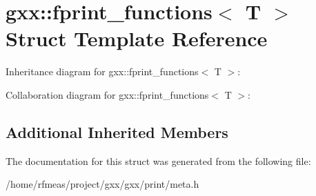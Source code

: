 \hypertarget{structgxx_1_1fprint__functions}{}\section{gxx\+:\+:fprint\+\_\+functions$<$ T $>$ Struct Template Reference}
\label{structgxx_1_1fprint__functions}


Inheritance diagram for gxx\+:\+:fprint\+\_\+functions$<$ T $>$\+:


Collaboration diagram for gxx\+:\+:fprint\+\_\+functions$<$ T $>$\+:
\subsection*{Additional Inherited Members}


The documentation for this struct was generated from the following file\+:\begin{DoxyCompactItemize}
\item 
/home/rfmeas/project/gxx/gxx/print/meta.\+h\end{DoxyCompactItemize}
